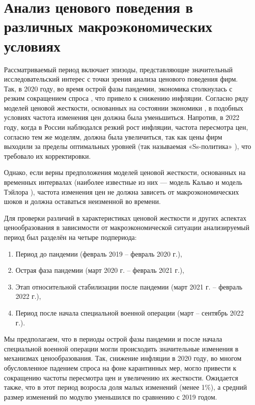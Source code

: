 \section{Анализ ценового поведения в различных макроэкономических условиях}

Рассматриваемый период включает эпизоды, представляющие значительный исследовательский интерес с точки зрения анализа ценового поведения фирм. Так, в 2020 году, во время острой фазы пандемии, экономика столкнулась с резким сокращением спроса \cite{source66}, что привело к снижению инфляции. Согласно ряду моделей ценовой жесткости, основанных на состоянии экономики \cite{source67,source68}, в подобных условиях частота изменения цен должна была уменьшиться. Напротив, в 2022 году, когда в России наблюдался резкий рост инфляции, частота пересмотра цен, согласно тем же моделям, должна была увеличиться, так как цены фирм выходили за пределы оптимальных уровней (так называемая «Ss-политика» \cite{source67,source68}), что требовало их корректировки.  

Однако, если верны предположения моделей ценовой жесткости, основанных на временных интервалах (наиболее известные из них — модель Кальво \cite{Calvo1983} и модель Тэйлора \cite{Taylor1980}), частота изменения цен не должна зависеть от макроэкономических шоков и должна оставаться неизменной во времени.  

Для проверки различий в характеристиках ценовой жесткости и других аспектах ценообразования в зависимости от макроэкономической ситуации анализируемый период был разделён на четыре подпериода:
\begin{enumerate}
	\item Период до пандемии (февраль 2019 – февраль 2020 г.),
	\item Острая фаза пандемии (март 2020 г. – февраль 2021 г.),
	\item Этап относительной стабилизации после пандемии (март 2021 г. – февраль 2022 г.),
	\item Период после начала специальной военной операции (март – сентябрь 2022 г.).
\end{enumerate}

Мы предполагаем, что в периоды острой фазы пандемии и после начала специальной военной операции могли происходить значительные изменения в механизмах ценообразования. Так, снижение инфляции в 2020 году, во многом обусловленное падением спроса на фоне карантинных мер, могло привести к сокращению частоты пересмотра цен и увеличению их жесткости. Ожидается также, что в этот период возросла доля малых изменений (менее 1\%), а средний размер изменений по модулю уменьшился по сравнению с 2019 годом.  

